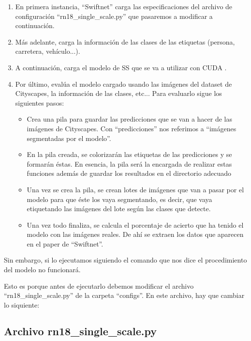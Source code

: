 \begin{enumerate}
\item En primera instancia, ``Swiftnet'' carga las especificaciones del archivo de configuración ``rn18\_single\_scale.py'' que pasaremos a modificar a continuación.
\item Más adelante, carga la información de las clases de las etiquetas (persona, carretera, vehículo...).
\item A continuación, carga el modelo de \ac{SS} que se va a utilizar con CUDA \cite{cuda}.
\item Por último, evalúa el modelo cargado usando las imágenes del dataset de Cityscapes, la información de las clases, etc... Para evaluarlo sigue los siguientes pasos:

\begin{itemize}
\item Crea una pila para guardar las predicciones que se van a hacer de las imágenes de Cityscapes. Con ``predicciones'' nos referimos a ``imágenes segmentadas por el modelo''.
\item En la pila creada, se colorizarán las etiquetas de las predicciones y se formarán éstas. En esencia, la pila será la encargada de realizar estas funciones además de guardar los resultados en el directorio adecuado
\item Una vez se crea la pila, se crean lotes de imágenes que van a pasar por el modelo para que éste los vaya segmentando, es decir, que vaya etiquetando las imágenes del lote según las clases que detecte.
\item Una vez todo finaliza, se calcula el porcentaje de acierto que ha tenido el modelo con las imágenes reales. De ahí se extraen los datos que aparecen en el paper de ``Swiftnet''.
\end{itemize}   
\end{enumerate}

Sin embargo, si lo ejecutamos siguiendo el comando que nos dice el procedimiento del modelo no funcionará.

Esto es porque antes de ejecutarlo debemos modificar el archivo ``rn18\_single\_scale.py'' de la carpeta ``configs''. En este archivo, hay que cambiar lo siquiente:

\subsection{Archivo rn18\_single\_scale.py}

